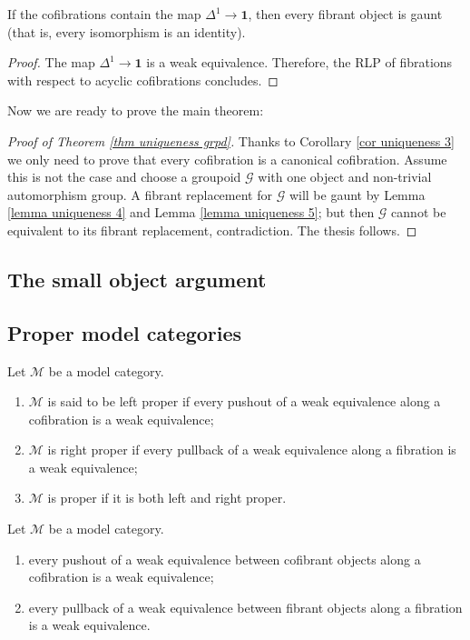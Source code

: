 \begin{refsection}
\begin{lemma} \label{lemma uniqueness 5}
If the cofibrations contain the map $\Delta^1 \to \mathbf 1$, then every fibrant object is gaunt (that is, every isomorphism is an identity).
\end{lemma}

\begin{proof}
The map $\Delta^1 \to \mathbf 1$ is a weak equivalence. Therefore, the RLP of fibrations with respect to acyclic cofibrations concludes.
\end{proof}

Now we are ready to prove the main theorem:

\begin{proof}[Proof of Theorem \ref{thm uniqueness grpd}]
Thanks to Corollary \ref{cor uniqueness 3} we only need to prove that every cofibration is a canonical cofibration. Assume this is not the case and choose a groupoid $\mathcal G$ with one object and non-trivial automorphism group. A fibrant replacement for $\mathcal G$ will be gaunt by Lemma \ref{lemma uniqueness 4} and Lemma \ref{lemma uniqueness 5}; but then $\mathcal G$ cannot be equivalent to its fibrant replacement, contradiction. The thesis follows.
\end{proof}

\subsection{The small object argument}

\subsection{Proper model categories}

\begin{defin}
Let $\mathcal M$ be a model category.
\begin{enumerate}
\item $\mathcal M$ is said to be left proper if every pushout of  a weak equivalence along a cofibration is a weak equivalence;
\item $\mathcal M$ is right proper if every pullback of a weak equivalence along a fibration is a weak equivalence;
\item $\mathcal M$ is proper if it is both left and right proper.
\end{enumerate}
\end{defin}

\begin{prop}
Let $\mathcal M$ be a model category.
\begin{enumerate}
\item every pushout of a weak equivalence between cofibrant objects along a cofibration is a weak equivalence;
\item every pullback of a weak equivalence between fibrant objects along a fibration is a weak equivalence.
\end{enumerate}
\end{prop}


\end{refsection}

